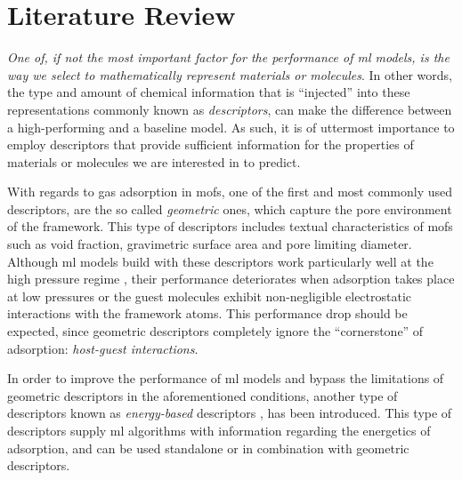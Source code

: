 \section{Literature Review}
\label{sec:literature}

\emph{One of, if not the most important factor for the performance of \gls{ml}
models, is the way we select to mathematically represent materials or
molecules}. In other words, the type and amount of chemical information that is
``injected'' into these representations commonly known as
\emph{descriptors}, can make the difference between a
high-performing and a baseline model. As such, it is of uttermost importance to
employ descriptors that provide sufficient information for the properties of
materials or molecules we are interested in to predict.

With regards to gas adsorption in \glspl{mof}, one of the
first and most commonly used descriptors, are the so called
\emph{geometric} ones, which capture the pore
environment of the framework. This type of descriptors includes textual
characteristics of \glspl{mof} such as void fraction,
gravimetric surface area and pore limiting
diameter. Although \gls{ml} models build with
these descriptors work particularly well at the high pressure regime
\parencite{Fernandez2013, Wu2020, Dureckova_2019}, their performance
deteriorates when adsorption takes place at low pressures or the
guest molecules exhibit non-negligible electrostatic interactions with the
framework atoms. This performance drop should be expected, since geometric
descriptors completely ignore the ``cornerstone'' of adsorption:
\emph{host-guest interactions}.

In order to improve the performance of \gls{ml} models and bypass the
limitations of geometric descriptors in the aforementioned conditions, another
type of descriptors known as \emph{energy-based} descriptors  \parencite{chong127, Shi_2023, robust, Orhan2023}, has been
introduced. This type of descriptors supply \gls{ml} algorithms with information
regarding the energetics of adsorption, and can be used standalone or in
combination with geometric descriptors.

